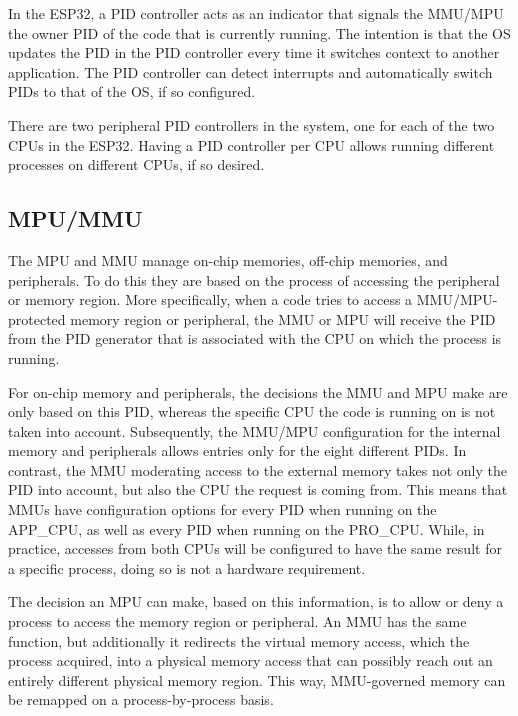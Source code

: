 \documentclass[main\_\_EN.tex]{subfiles}
\begin{document}
In the ESP32, a PID controller acts as an indicator that signals the MMU/MPU the owner PID of the code that is currently running. The intention is that the OS updates the PID in the PID controller every time it switches context to another application. The PID controller can detect interrupts and automatically switch PIDs to that of the OS, if so configured.

There are two peripheral PID controllers in the system, one for each of the two CPUs in the ESP32. Having a PID controller per CPU allows running different processes on different CPUs, if so desired.

\subsection{MPU/MMU}
The MPU and MMU manage on-chip memories, off-chip memories, and peripherals. To do this they are based on the process of accessing the peripheral or memory region. More specifically, when a code tries to access a MMU/MPU-protected memory region or peripheral, the MMU or MPU will receive the PID from the PID generator that is associated with the CPU on which the process is running.

For on-chip memory and peripherals, the decisions the MMU and MPU make are only based on this PID, whereas the specific CPU the code is running on is not taken into account. Subsequently, the MMU/MPU configuration for the internal memory and peripherals allows entries only for the eight different PIDs. In contrast, the MMU moderating access to the external memory takes not only the PID into account, but also the CPU the request is coming from. This means that MMUs have configuration options for every PID when running on the APP\_CPU, as well as every PID when running on the PRO\_CPU. While, in practice, accesses from both CPUs will be configured to have the same result for a specific process, doing so is not a hardware requirement.

The decision an MPU can make, based on this information, is to allow or deny a process to access the memory region or peripheral. An MMU has the same function, but additionally it redirects the virtual memory access, which the process acquired, into a physical memory access that can possibly reach out an entirely different physical memory region. This way, MMU-governed memory can be remapped on a process-by-process basis.








\end{document}
